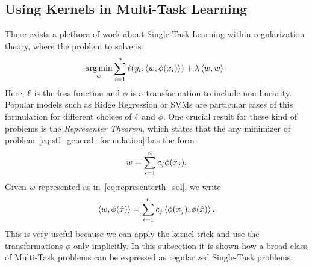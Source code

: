  


\subsection{Using Kernels in Multi-Task Learning} \label{subsec:kernels_mtl}
There exists a plethora of work about Single-Task Learning within regularization theory, where the problem to solve is
\begin{equation}
    \label{eq:stl_general_formulation}
    \begin{aligned}
        \argmin_{w} & \sum_{i=1}^{\nsamples} \lossf(y_i, \dotp{w}{\phi(x_i)}) + \lambda \dotp{w}{w} .\\
    \end{aligned}
\end{equation}
Here, $\ell$ is the loss function and $\phi$ is a transformation to include non-linearity. Popular models such as Ridge Regression or SVMs are particular cases of this formulation for different choices of $\ell$ and $\phi$.
One crucial result for these kind of problems is the \emph{Representer Theorem}, which states that the any minimizer of problem~\eqref{eq:stl_general_formulation} has the form
\begin{equation}
    \label{eq:representerth_sol}
    w = \sum_{i=1}^\nsamples c_j \phi(x_j) .
\end{equation}
Given $w$ represented as in~\eqref{eq:representerth_sol}, we write
\begin{equation}
    \nonumber
    \left\langle w, \phi(\hat{x}) \right\rangle = \sum_{i=1}^n c_j \left\langle \phi(x_j), \phi(\hat{x}) \right\rangle.
\end{equation}
This is very useful because we can apply the kernel trick and use the transformations $\phi$ only implicitly.
In this subsection it is shown how a broad class of Multi-Task problems can be expressed as regularized Single-Task problems.

